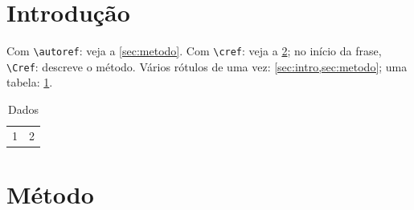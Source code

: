 \documentclass[a4paper]{article}
\begin{document}
\section{Introdução}\label{sec:intro}
Com \verb|\autoref|: veja a \autoref{sec:metodo}. Com \verb|\cref|: veja a
\cref{sec:metodo}; no início da frase, \verb|\Cref|: 
descreve o método. Vários rótulos de uma vez: \cref{sec:intro,sec:metodo};
uma tabela: \cref{tab:dados}.

\begin{table}[h]
  \centering
  \caption{Dados}\label{tab:dados}
  \begin{tabular}{cc} 1 & 2 \\ \end{tabular}
\end{table}

\section{Método}\label{sec:metodo}
\end{document}
